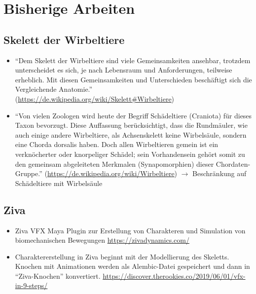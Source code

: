 
\chapter{Bisherige Arbeiten}


\section{Skelett der Wirbeltiere}

\begin{itemize}
 \item "`Dem Skelett der Wirbeltiere sind viele Gemeinsamkeiten ansehbar, trotzdem unterscheidet es sich, je nach Lebensraum und Anforderungen, teilweise erheblich. Mit diesen Gemeinsamkeiten und Unterschieden beschäftigt sich die Vergleichende Anatomie."' (\url{https://de.wikipedia.org/wiki/Skelett#Wirbeltiere})  %
 \item "`Von vielen Zoologen wird heute der Begriff Schädeltiere (Craniota) für dieses Taxon bevorzugt. Diese Auffassung berücksichtigt, dass die Rundmäuler, wie auch einige andere Wirbeltiere, als Achsenskelett keine Wirbelsäule, sondern eine Chorda dorsalis haben. Doch allen Wirbeltieren gemein ist ein verknöcherter oder knorpeliger Schädel; sein Vorhandensein gehört somit zu den gemeinsam abgeleiteten Merkmalen (Synapomorphien) dieser Chordaten-Gruppe."' (\url{https://de.wikipedia.org/wiki/Wirbeltiere}) $\rightarrow$ Beschränkung auf Schädeltiere mit Wirbelsäule
\end{itemize}

\section{Ziva}

\begin{itemize}
 \item Ziva VFX Maya Plugin zur Erstellung von Charakteren und Simulation von biomechanischen Bewegungen \url{https://zivadynamics.com/}
 \item Charaktererstellung in Ziva beginnt mit der Modellierung des Skeletts. Knochen mit Animationen werden als Alembic-Datei gespeichert und dann in "`Ziva-Knochen"' konvertiert. \url{https://discover.therookies.co/2019/06/01/vfx-in-9-steps/}
\end{itemize}

